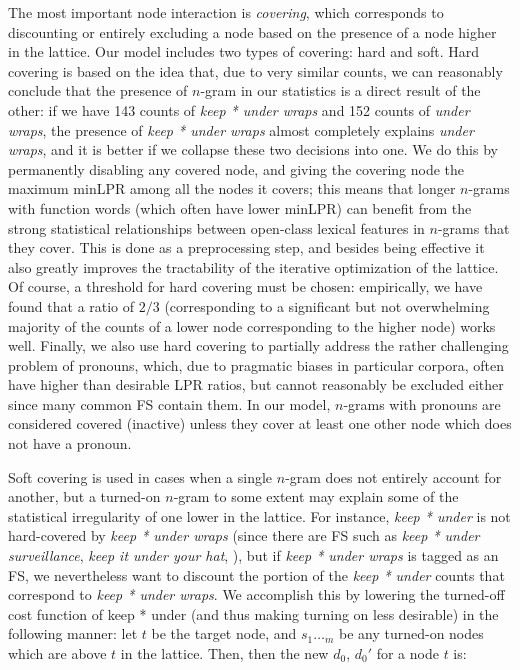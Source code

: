 \documentclass[11pt]{article}
\begin{document}
The most important node interaction is \textit{covering}, which corresponds to discounting or entirely excluding a node based on the presence of a node higher in the lattice. Our model includes two types of covering: hard and soft. Hard covering is based on the idea that, due to very similar counts, we can reasonably conclude that the presence of $n$-gram in our statistics is a direct result of the other: if we have 143 counts of \emph{keep * under wraps} and 152 counts of \emph{under wraps}, the presence of \emph{keep * under wraps} almost completely explains \emph{under wraps}, and it is better if we collapse these two decisions into one. We do this by permanently disabling any covered node, and giving the covering node the maximum minLPR among all the nodes it covers; this means that longer $n$-grams with function words (which often have lower minLPR) can benefit from the strong statistical relationships between open-class lexical features in $n$-grams that they cover. This is done as a preprocessing step, and besides being effective it also greatly improves the tractability of the iterative optimization of the lattice. Of course, a threshold for hard covering must be chosen: empirically, we have found that a ratio of $2/3$ (corresponding to a significant but not overwhelming majority of the counts of a lower node corresponding to the higher node) works well. Finally, we also use hard covering to partially address the rather challenging problem of pronouns, which, due to pragmatic biases in particular corpora, often have higher than desirable LPR ratios, but cannot reasonably be excluded either since many common FS contain them. In our model, $n$-grams with pronouns are considered covered (inactive) unless they cover at least one other node which does not have a pronoun.

Soft covering is used in cases when a single $n$-gram does not entirely account for another, but a turned-on $n$-gram to some extent may explain some of the statistical irregularity of one lower in the lattice. For instance, \emph{keep * under} is not hard-covered by \emph{keep * under wraps} (since there are FS such as \emph{keep * under surveillance}, \emph{keep it under your hat}, \etc), but if \emph{keep * under wraps} is tagged as an FS, we nevertheless want to discount the portion of the \emph{keep * under} counts that correspond to \emph{keep * under wraps}. We accomplish this by lowering the turned-off cost function of {keep * under} (and thus making turning on less desirable) in the following manner: let $t$ be the target node, and $s_1\ldots_m$ be any turned-on nodes which are above $t$ in the lattice. Then, then the new $d_0$, $d_0'$ for a node $t$ is:
\end{document}
